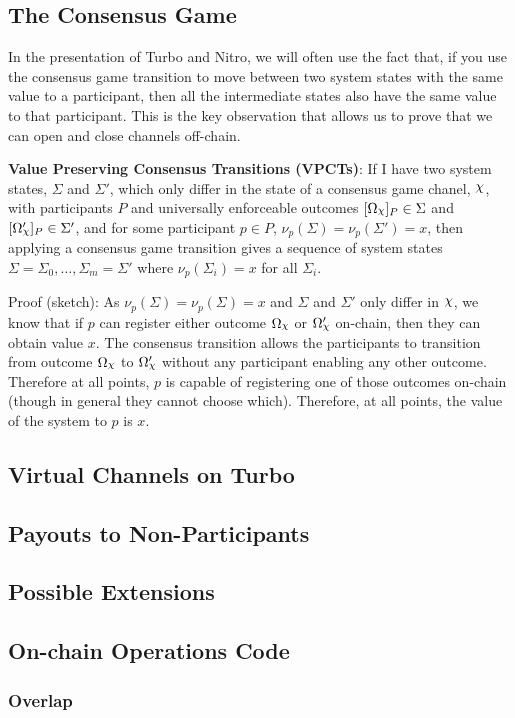 \documentclass{article}
\begin{document}
\subsection{The Consensus Game}

In the presentation of Turbo and Nitro, we will often use the fact that, if you use the
consensus game transition to move between two system states with the same value to a
participant, then all the intermediate states also have the same value to that participant.
This is the key observation that allows us to prove that we can open and close channels
off-chain.

\textbf{Value Preserving Consensus Transitions (VPCTs)}:
If I have two system states, $\Sigma$ and $\Sigma'$, which only differ in the state of
a consensus game chanel, $\rchi$, with participants $P$ and universally enforceable outcomes
$\enf{\Omega_\rchi}_P \in \Sigma$ and $\enf{\Omega'_\rchi}_P \in \Sigma'$, and 
for some participant $p \in P$, $\nu_p(\Sigma) = \nu_p(\Sigma') = x$, then
applying a consensus game transition gives a sequence of system states 
$\Sigma = \Sigma_0, \dots, \Sigma_m = \Sigma'$ where $\nu_p(\Sigma_i) = x$ for all $\Sigma_i$.

Proof (sketch): As $\nu_p(\Sigma) = \nu_p(\Sigma) = x$ and $\Sigma$ and $\Sigma'$ only differ
in $\rchi$, we know that if $p$ can register either outcome $\Omega_\rchi$ or $\Omega'_\rchi$ on-chain, then
they can obtain value $x$. The consensus transition allows the participants to transition
from outcome $\Omega_\rchi$ to $\Omega'_\rchi$ without any participant enabling any other outcome.
Therefore at all points, $p$ is capable of registering one of those outcomes on-chain (though
in general they cannot choose which).
Therefore, at all points, the value of the system to $p$ is $x$.

\subsection{Virtual Channels on Turbo}
\subsection{Payouts to Non-Participants}
\subsection{Possible Extensions}

\subsection{On-chain Operations Code}
\subsubsection{Overlap}
\begin{minipage}{\linewidth} %
  
\end{minipage}
\end{document}
